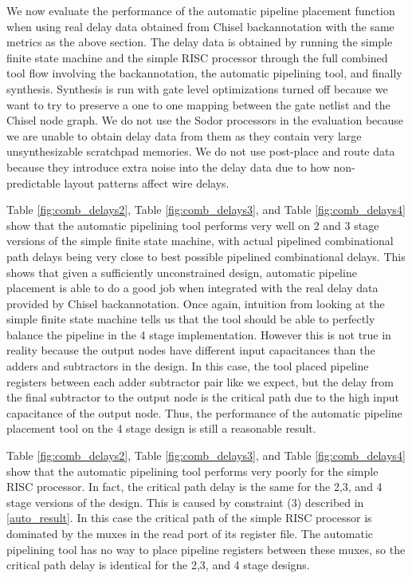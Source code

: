 We now evaluate the performance of the automatic pipeline placement function when using real delay data obtained from Chisel backannotation with the same metrics as the above section. The delay data is obtained by running the simple finite state machine and the simple RISC processor through the full combined tool flow involving the backannotation, the automatic pipelining tool, and finally synthesis. Synthesis is run with gate level optimizations turned off because we want to try to preserve a one to one mapping between the gate netlist and the Chisel node graph. We do not use the Sodor processors in the evaluation because we are unable to obtain delay data from them as they contain very large unsynthesizable scratchpad memories. We do not use post-place and route data because they introduce extra noise into the delay data due to how non-predictable layout patterns affect wire delays.

Table \ref{fig:comb_delays2}, Table \ref{fig:comb_delays3}, and Table \ref{fig:comb_delays4} show that the automatic pipelining tool performs very well on 2 and 3 stage versions of the simple finite state machine, with actual pipelined combinational path delays being very close to best possible pipelined combinational delays. This shows that given a sufficiently unconstrained design, automatic pipeline placement is able to do a good job when integrated with the real delay data provided by Chisel backannotation. Once again, intuition from looking at the simple finite state machine tells us that the tool should be able to perfectly balance the pipeline in the 4 stage implementation. However this is not true in reality because the output nodes have different input capacitances than the adders and subtractors in the design. In this case, the tool placed pipeline registers between each adder subtractor pair like we expect, but the delay from the final subtractor to the output node is the critical path due to the high input capacitance of the output node. Thus, the performance of the automatic pipeline placement tool on the 4 stage design is still a reasonable result.

Table \ref{fig:comb_delays2}, Table \ref{fig:comb_delays3}, and Table \ref{fig:comb_delays4} show that the automatic pipelining tool performs very poorly for the simple RISC processor. In fact, the critical path delay is the same for the 2,3, and 4 stage versions of the design. This is caused by constraint (3) described in \ref{auto_result}. In this case the critical path of the simple RISC processor is dominated by the muxes in the read port of its register file. The automatic pipelining tool has no way to place pipeline registers between these muxes, so the critical path delay is identical for the 2,3, and 4 stage designs.

